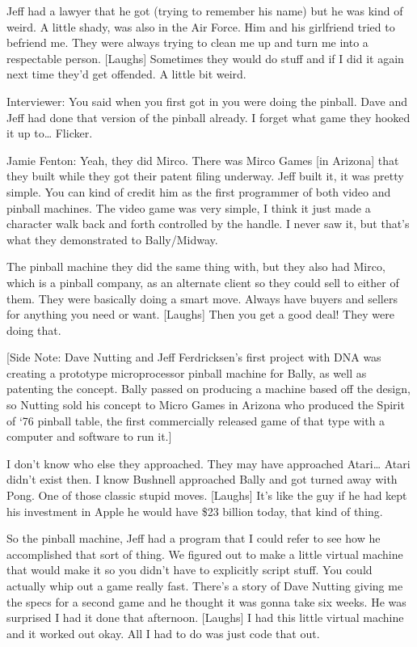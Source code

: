 Jeff had a lawyer that he got (trying to remember his name) but he was kind of weird. A little shady, was also in the Air Force. Him and his girlfriend tried to befriend me. They were always trying to clean me up and turn me into a respectable person. [Laughs] Sometimes they would do stuff and if I did it again next time they’d get offended. A little bit weird.

\textcolor{interviewer}{Interviewer:} You said when you first got in you were doing the pinball. Dave and Jeff had done that version of the pinball already. I forget what game they hooked it up to… Flicker.

\textcolor{interviewee}{Jamie Fenton:} Yeah, they did Mirco. There was Mirco Games [in Arizona] that they built while they got their patent filing underway. Jeff built it, it was pretty simple. You can kind of credit him as the first programmer of both video and pinball machines. The video game was very simple, I think it just made a character walk back and forth controlled by the handle. I never saw it, but that’s what they demonstrated to Bally/Midway.

The pinball machine they did the same thing with, but they also had Mirco, which is a pinball company, as an alternate client so they could sell to either of them. They were basically doing a smart move. Always have buyers and sellers for anything you need or want. [Laughs] Then you get a good deal! They were doing that.

[Side Note: Dave Nutting and Jeff Ferdricksen’s first project with DNA was creating a prototype microprocessor pinball machine for Bally, as well as patenting the concept. Bally passed on producing a machine based off the design, so Nutting sold his concept to Micro Games in Arizona who produced the Spirit of ‘76 pinball table, the first commercially released game of that type with a computer and software to run it.]

I don’t know who else they approached. They may have approached Atari… Atari didn’t exist then. I know Bushnell approached Bally and got turned away with Pong. One of those classic stupid moves. [Laughs] It’s like the guy if he had kept his investment in Apple he would have \$23 billion today, that kind of thing.

So the pinball machine, Jeff had a program that I could refer to see how he accomplished that sort of thing. We figured out to make a little virtual machine that would make it so you didn’t have to explicitly script stuff. You could actually whip out a game really fast. There’s a story of Dave Nutting giving me the specs for a second game and he thought it was gonna take six weeks. He was surprised I had it done that afternoon. [Laughs] I had this little virtual machine and it worked out okay. All I had to do was just code that out.

